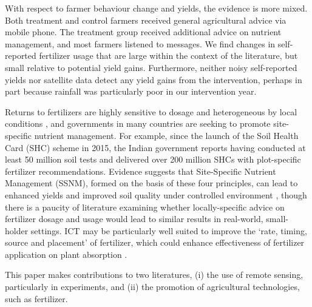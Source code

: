 \documentclass{article}
\begin{document}
With respect to farmer behaviour change and yields, the evidence is more mixed. Both treatment and control farmers received general agricultural advice via mobile phone. The treatment group received additional advice on nutrient management, and most farmers listened to messages. We find changes in self-reported fertilizer usage that are large within the context of the literature, but small relative to potential yield gains. Furthermore, neither noisy self-reported yields nor satellite data detect any yield gains from the intervention, perhaps in part because rainfall was particularly poor in our intervention year.

Returns to fertilizers are highly sensitive to dosage and heterogeneous by local conditions \citep{Duflo2008HowKenya,Suri2011SELECTIONADOPTION}, and governments in many countries are seeking to promote site-specific nutrient management. For example, since the launch of the Soil Health Card (SHC) scheme in 2015, the Indian government reports having conducted at least 50 million soil tests and delivered over 200 million SHCs with plot-specific fertilizer recommendations. Evidence suggests that Site-Specific Nutrient Management (SSNM), formed on the basis of these four principles, can lead to enhanced yields and improved soil quality under controlled environment \citep{Khurana2007PerformanceIndia,Pampolino2007EnvironmentalSystems,Cassman2002AgroecosystemsManagement,Matson1998IntegrationManagement}, though there is a paucity of literature examining whether locally-specific advice on fertilizer dosage and usage would lead to similar results in real-world, small-holder settings. ICT may be particularly well suited to improve the ‘rate, timing, source and placement’ of fertilizer, which could enhance effectiveness of fertilizer application on plant absorption \citep{Pagani2013Site-SpecificReturn}.

This paper makes contributions to two literatures, (i) the use of remote sensing, particularly in experiments, and (ii) the promotion of agricultural technologies, such as fertilizer. 
\end{document}
